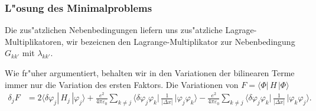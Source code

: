 \subsubsection{L"osung des Minimalproblems}
Die zus"atzlichen Nebenbedingungen liefern uns zus"atzliche
Lagrage-Multiplikatoren, wir bezeicnen den Lagrange-Multiplikator
zur Nebenbedingung $G_{kk'}$ mit $\lambda_{kk'}$.

Wie fr"uher argumentiert, behalten wir in den Variationen der
bilinearen Terme immer nur die Variation des ersten Faktors.
Die Variationen von $F=\langle\Phi|\,H\,|\Phi\rangle$
\begin{align*}
\delta_j F
&=
2\langle\delta\varphi_j|\,H_j\,|\varphi_j\rangle
+
\frac{e^2}{4\pi\varepsilon_0}
\sum_{k\ne j}
\biggl\langle\delta\varphi_j\varphi_k\biggr|\,
\frac{1}{|\Delta x|}
\,\biggl|\varphi_j \varphi_k\biggr\rangle
-
\frac{e^2}{4\pi\varepsilon_0}
\sum_{k\ne j}
\biggl\langle\delta\varphi_j\varphi_k\biggr|\,
\frac{1}{|\Delta x|}
\,\biggl|\varphi_k \varphi_j\biggr\rangle.
\end{align*}

